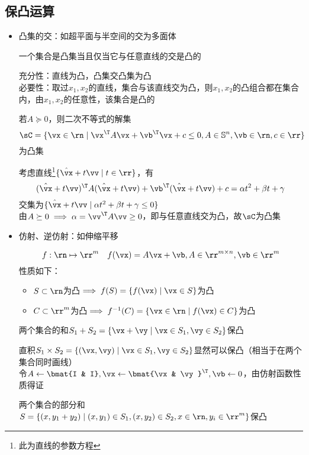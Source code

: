 \subsection{保凸运算}
\begin{itemize}
	\item 凸集的交：如超平面与半空间的交为多面体
\begin{theorem}
	一个集合是凸集当且仅当它与任意直线的交是凸的
\end{theorem}
\begin{analysis}
	充分性：直线为凸，凸集交凸集为凸\\
	必要性：取过$x_1,x_2$的直线，集合与该直线交为凸，则$x_1,x_2$的凸组合都在集合内，由$x_1,x_2$的任意性，该集合是凸的
\end{analysis}
\begin{example}
	若$A\succeq 0$，则二次不等式的解集
	\[\sC=\{\vx\in\rn\mid \vx^\T A\vx+\vb^\T\vx+c\leq 0,A\in\mathbb{S}^n,\vb\in\rn,c\in\rr\}\]
	为凸集
\end{example}
\begin{analysis}
	考虑直线\footnote{此为直线的参数方程}$\{\hat{\vx}+t\vv\mid t\in\rr\}$，有
	\[(\hat{\vx}+t\vv)^\T A(\hat{\vx}+t\vv)+\vb^\T(\hat{\vx}+t\vv)+c=\alpha t^2+\beta t+\gamma\]
	交集为$\{\hat{\vx}+t\vv\mid\alpha t^2+\beta t+\gamma\leq 0\}$\\
	由$A\succeq 0\implies\alpha=\vv^\T A\vv\geq 0$，即与任意直线交为凸，故$\sC$为凸集
\end{analysis}

	\item 仿射、逆仿射：如伸缩平移
\begin{definition}[仿射函数]
\[f:\rn\mapsto\rr^m\quad f(\vx)=A\vx+\vb,A\in\rr^{m\times n},\vb\in\rr^m\]
性质如下：
\begin{itemize}
	\item $S\subset\rn$为凸$\implies f(S)=\{f(\vx)\mid\vx\in S\}$为凸
	\item $C\subset\rr^m$为凸$\implies f^{-1}(C)=\{\vx\in\rn\mid f(\vx)\in C\}$为凸
\end{itemize}
\end{definition}
\begin{example}
两个集合的和$S_1+S_2=\{\vx+\vy\mid \vx\in S_1,\vy\in S_2\}$保凸
\end{example}
\begin{analysis}
直积$S_1\times S_2=\{(\vx,\vy)\mid \vx\in S_1,\vy\in S_2\}$显然可以保凸（相当于在两个集合同时画线）\\
令$A\gets\bmat{I & I},\vx\gets\bmat{\vx & \vy}^\T,\vb\gets 0$，由仿射函数性质得证
\end{analysis}
\begin{example}
	两个集合的部分和$S=\{(x,y_1+y_2)\mid(x,y_1)\in S_1,(x,y_2)\in S_2,x\in\rn,y_i\in\rr^m\}$保凸
\end{example}


\end{itemize}
